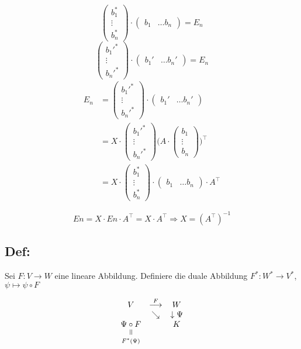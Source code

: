 \documentclass[titlepage,12pt,a4paper,ngerman]{report}
\newcommand{\verteq}{\rotatebox{90}{$\,=$}}
\newcommand{\equalto}[2]{\underset{\scriptstyle\overset{\mkern4mu\verteq}{#2}}{#1}}
\begin{document}
$$\begin{pmatrix}
b_1^*\\
\vdots\\
b_n^*
\end{pmatrix} \cdot \begin{pmatrix}
b_1 & \dots b_n
\end{pmatrix} = E_n $$
$$\begin{pmatrix}
b_1'^*\\
\vdots\\
b_n'^*
\end{pmatrix} \cdot \begin{pmatrix}
b_1' & \dots b_n'
\end{pmatrix} = E_n $$
\begin{align*}
E_n &= \begin{pmatrix}
b_1'^*\\
\vdots\\
b_n'^*
\end{pmatrix} \cdot \begin{pmatrix}
b_1' & \dots b_n'
\end{pmatrix}\\
&= X \cdot \begin{pmatrix}
b_1'^*\\
\vdots\\
b_n'^*
\end{pmatrix} \bigg( A \cdot \begin{pmatrix}
b_1\\
\vdots\\
b_n
\end{pmatrix} \bigg) ^\top\\
&= X \cdot \begin{pmatrix}
b_1^*\\
\vdots\\
b_n^*
\end{pmatrix} \cdot \begin{pmatrix}
b_1 & \dots b_n
\end{pmatrix} \cdot A^\top
\end{align*}

$$En = X \cdot En \cdot A^\top = X \cdot A^\top \Rightarrow X = (A^\top)^{-1}$$

\subsection{Def:}
Sei $F: V \to W$ eine lineare Abbildung. Definiere die duale Abbildung $F^* : W^* \to V^*$, $\psi \mapsto \psi \circ F$


$$\begin{array}{ccc}
V & \buildrel F \over \longrightarrow & W \\
& \searrow & \downarrow \Psi \\
\equalto{\Psi \circ F }{F^*(\Psi)} & & K
\end{array}$$
\end{document}
